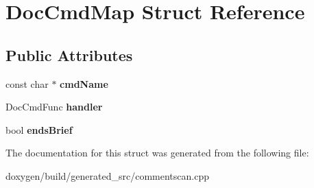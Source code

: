 \hypertarget{struct_doc_cmd_map}{}\section{Doc\+Cmd\+Map Struct Reference}
\label{struct_doc_cmd_map}
\subsection*{Public Attributes}
\begin{DoxyCompactItemize}
\item 
\mbox{\label{struct_doc_cmd_map_a37e85944ed1f5be8cec004b4686d3ed1}} 
const char $\ast$ {\bfseries cmd\+Name}
\item 
\mbox{\label{struct_doc_cmd_map_af819abbea48c5ed9c466986e97cb9c75}} 
Doc\+Cmd\+Func {\bfseries handler}
\item 
\mbox{\label{struct_doc_cmd_map_afc78de9e4a41eec7995964f08f53f440}} 
bool {\bfseries ends\+Brief}
\end{DoxyCompactItemize}


The documentation for this struct was generated from the following file\+:\begin{DoxyCompactItemize}
\item 
doxygen/build/generated\+\_\+src/commentscan.\+cpp\end{DoxyCompactItemize}
